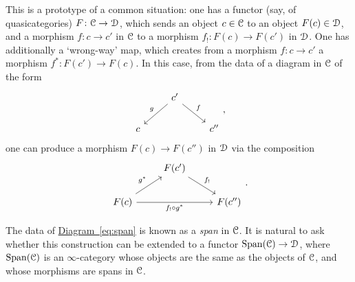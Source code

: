 \documentclass[main.tex]{subfiles}
\begin{document}
This is a prototype of a common situation: one has a functor (say, of quasicategories) $F\colon \mathcal{C} \to \mathcal{D}$, which sends an object $c \in \mathcal{C}$ to an object $F(c) \in \mathcal{D}$, and a morphism $f\colon c \to c'$ in $\mathcal{C}$ to a morphism $f_{!}\colon F(c) \to F(c')$ in $\mathcal{D}$. One has additionally a `wrong-way' map, which creates from a morphism $f\colon c \to c'$ a morphism $f^{*}\colon F(c') \to F(c)$. In this case, from the data of a diagram in $\mathcal{C}$ of the form
\begin{equation}
  \label{eq:span}
  \begin{tikzcd}
    & c'
    \arrow[dl, swap, "g"]
    \arrow[dr, "f"]
    \\
    c
    && c''
  \end{tikzcd},
\end{equation}
one can produce a morphism $F(c) \to F(c'')$ in $\mathcal{D}$ via the composition
\begin{equation*}
  \begin{tikzcd}
    & F(c')
    \arrow[dr, "f_{!}"]
    \\
    F(c)
    \arrow[ur, "g^{*}"]
    \arrow[rr, swap, "f_{!} \circ g^{*}"]
    && F(c'')
  \end{tikzcd}.
\end{equation*}

The data of \hyperref[eq:span]{Diagram~\ref*{eq:span}} is known as a \emph{span} in $\mathcal{C}$. It is natural to ask whether this construction can be extended to a functor $\mathrm{Span}(\mathcal{C}) \to \mathcal{D}$, where $\mathrm{Span}(\mathcal{C})$ is an $\infty$-category whose objects are the same as the objects of $\mathcal{C}$, and whose morphisms are spans in $\mathcal{C}$.
\end{document}
